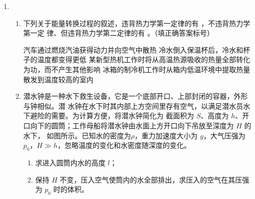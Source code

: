 \begin{enumerate}


\item
\begin{enumerate}
\item
下列关于能量转换过程的叙述，违背热力学第一定律的有 \underlinegap ，不违背热力学第一定
律、但违背热力学第二定律的有 \underlinegap 。（填正确答案标号）

\fourchoices
{汽车通过燃烧汽油获得动力并向空气中散热}
{冷水倒入保温杯后，冷水和杯子的温度都变得更低}
{某新型热机工作时将从高温热源吸收的热量全部转化为功，而不产生其他影响}
{冰箱的制冷机工作时从箱内低温环境中提取热量散发到温度较高的室内}




\item 
潜水钟是一种水下救生设备，它是一个底部开口、上部封闭的容器，外形与钟相似。潜
水钟在水下时其内部上方空间里存有空气，以满足潜水员水下避险的需要。为计算方便，将潜水钟简化为
截面积为 $ S $、高度为 $ h $、开口向下的圆筒；工作母船将潜水钟由水面上方开口向下吊放至深度为 $ H $ 的水下，
如图所示。已知水的密度为$ \rho $，重力加速度大小为 $ g $，大气压强为 $ p_{0} $，$H \gg h$，忽略温度的变化和水密度随深度的变化。
\begin{enumerate}
\item
求进入圆筒内水的高度 $ l $；
\item 
保持 $ H $ 不变，压入空气使筒内的水全部排出，求压入的空气在其压强为 $ p_{0} $ 时的体积。
\end{enumerate}
\begin{figure}[h!]
\flushright

\end{figure}







\end{enumerate}





\newpage


\end{enumerate}
